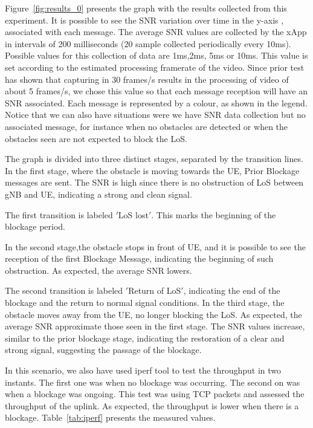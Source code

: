 Figure~\ref{fig:results_0} presents the graph with the results collected from this experiment.
It is possible to see the SNR variation over time in the y-axis , associated with each message.
The average SNR values are collected by the xApp in intervals of 200 milliseconds (20 sample collected periodically every 10ms).
Possible values for this collection of data are 1ms,2ms, 5ms or 10ms.
This value is set according to the estimated processing framerate of the video.
Since prior test has shown that capturing in 30 frames/s results in the processing of video of about 5 frames/s, we chose this value so that each message reception will have an SNR associated.
Each message is represented by a colour, as shown in the legend.
Notice that we can also have situations were we have SNR data collection but no associated message, for instance when no obstacles are detected or when the obstacles seen are not expected to block the LoS\@.

The graph is divided into three distinct stages, separated by the transition lines.
In the first stage, where the obstacle is moving towards the UE, Prior Blockage messages are sent.
The SNR is high  since there is no obstruction of LoS between gNB and UE, indicating a strong and clean signal.

The first transition is labeled \('\)LoS lost\('\).
This marks the beginning of the blockage period.

In the second stage,the obstacle stops in front of UE, and it is possible to see the reception of the first Blockage Message, indicating the beginning of such obstruction.
As expected, the average SNR lowers.

The second transition is labeled \('\)Return of LoS\('\), indicating the end of the blockage and the return to normal signal conditions.
In the third stage, the obstacle moves away from the UE, no longer blocking the LoS\@.
As expected, the average SNR approximate those seen in the first stage.
The SNR values increase, similar to the prior blockage stage, indicating the restoration of a clear and strong signal, suggesting the passage of the blockage.

In this scenario, we also have used iperf tool to test the throughput in two instants.
The first one was when no blockage was occurring.
The second on was when a blockage was ongoing.
This test was using TCP packets and assessed the throughput of the uplink.
As expected, the throughput is lower when there is a blockage.
Table~\ref{tab:iperf} presents the measured values.


